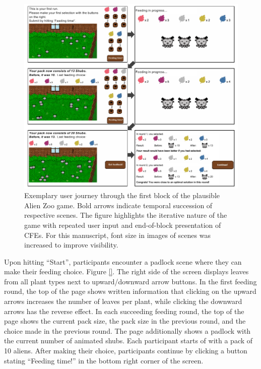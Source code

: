 \begin{figure}
   \centering
   \includegraphics[width=\textwidth]{./media/FigureGameInterface.pdf}
   \caption{Exemplary user journey through the first block of the plausible Alien Zoo game. Bold arrows indicate temporal succession of respective scenes. The figure highlights the iterative nature of the game with repeated user input and end-of-block presentation of \glspl{CFE}. For this manuscript, font size in images of scenes was increased to improve visibility.}
   \label{fig:StudyStructure}
 \end{figure}

Upon hitting ``Start'', participants encounter a padlock scene where they can make their feeding choice.
Figure \ref{}.
The right side of the screen displays leaves from all plant types next to upward/downward arrow buttons. 
In the first feeding round, the top of the page shows written information that clicking on the upward arrows increases the number of leaves per plant, while clicking the downward arrows has the reverse effect.
In each succeeding feeding round, the top of the page shows the current pack size, the pack size in the previous round, and the choice made in the previous round.
The page additionally shows a padlock with the current number of animated shubs.
Each participant starts of with a pack of 10 aliens.
After making their choice, participants continue by clicking a button stating ``Feeding time!'' in the bottom right corner of the screen.

